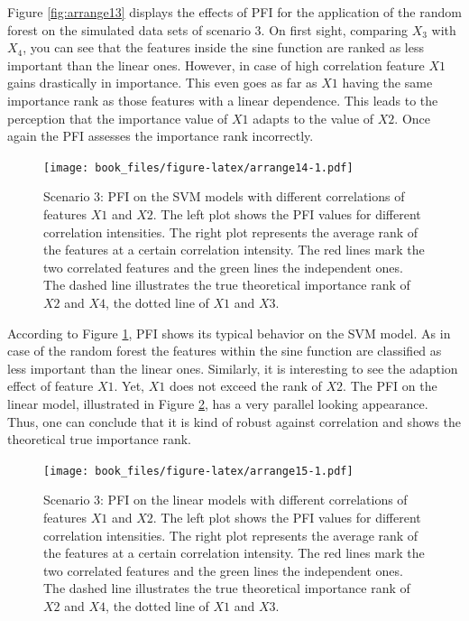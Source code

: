 \documentclass[]{krantz}
\begin{document}
Figure \ref{fig:arrange13} displays the effects of PFI for the
application of the random forest on the simulated data sets of scenario
3. On first sight, comparing \(X_3\) with \(X_4\), you can see that the
features inside the sine function are ranked as less important than the
linear ones. However, in case of high correlation feature \(X1\) gains
drastically in importance. This even goes as far as \(X1\) having the
same importance rank as those features with a linear dependence. This
leads to the perception that the importance value of \(X1\) adapts to
the value of \(X2\). Once again the PFI assesses the importance rank
incorrectly.

\begin{figure}
\centering
\texttt{[image: book\_files/figure-latex/arrange14-1.pdf]}
\caption{\label{fig:arrange14}Scenario 3: PFI on the SVM models with
different correlations of features \(X1\) and \(X2\). The left plot
shows the PFI values for different correlation intensities. The right
plot represents the average rank of the features at a certain
correlation intensity. The red lines mark the two correlated features
and the green lines the independent ones. The dashed line illustrates
the true theoretical importance rank of \(X2\) and \(X4\), the dotted
line of \(X1\) and \(X3\).}
\end{figure}

According to Figure \ref{fig:arrange14}, PFI shows its typical behavior
on the SVM model. As in case of the random forest the features within
the sine function are classified as less important than the linear ones.
Similarly, it is interesting to see the adaption effect of feature
\(X1\). Yet, \(X1\) does not exceed the rank of \(X2\). The PFI on the
linear model, illustrated in Figure \ref{fig:arrange15}, has a very
parallel looking appearance. Thus, one can conclude that it is kind of
robust against correlation and shows the theoretical true importance
rank.

\begin{figure}
\centering
\texttt{[image: book\_files/figure-latex/arrange15-1.pdf]}
\caption{\label{fig:arrange15}Scenario 3: PFI on the linear models with
different correlations of features \(X1\) and \(X2\). The left plot
shows the PFI values for different correlation intensities. The right
plot represents the average rank of the features at a certain
correlation intensity. The red lines mark the two correlated features
and the green lines the independent ones. The dashed line illustrates
the true theoretical importance rank of \(X2\) and \(X4\), the dotted
line of \(X1\) and \(X3\).}
\end{figure}
\end{document}
